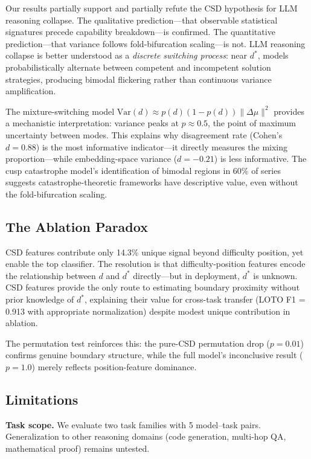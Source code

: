 \documentclass[11pt,letterpaper]{article}
\begin{document}
Our results partially support and partially refute the CSD hypothesis for LLM reasoning collapse. The qualitative prediction---that observable statistical signatures precede capability breakdown---is confirmed. The quantitative prediction---that variance follows fold-bifurcation scaling---is not. LLM reasoning collapse is better understood as a \emph{discrete switching process}: near $d^*$, models probabilistically alternate between competent and incompetent solution strategies, producing bimodal flickering rather than continuous variance amplification.

The mixture-switching model $\text{Var}(d) \approx p(d)(1-p(d))\|\Delta\mu\|^2$ provides a mechanistic interpretation: variance peaks at $p \approx 0.5$, the point of maximum uncertainty between modes. This explains why disagreement rate (Cohen's $d = 0.88$) is the most informative indicator---it directly measures the mixing proportion---while embedding-space variance ($d = -0.21$) is less informative. The cusp catastrophe model's identification of bimodal regions in 60\% of series suggests catastrophe-theoretic frameworks have descriptive value, even without the fold-bifurcation scaling.

\subsection{The Ablation Paradox}

CSD features contribute only 14.3\% unique signal beyond difficulty position, yet enable the top classifier. The resolution is that difficulty-position features encode the relationship between $d$ and $d^*$ directly---but in deployment, $d^*$ is unknown. CSD features provide the only route to estimating boundary proximity without prior knowledge of $d^*$, explaining their value for cross-task transfer (LOTO F1 = 0.913 with appropriate normalization) despite modest unique contribution in ablation.

The permutation test reinforces this: the pure-CSD permutation drop ($p = 0.01$) confirms genuine boundary structure, while the full model's inconclusive result ($p = 1.0$) merely reflects position-feature dominance.

\subsection{Limitations}

\textbf{Task scope.} We evaluate two task families with 5 model--task pairs. Generalization to other reasoning domains (code generation, multi-hop QA, mathematical proof) remains untested.
\end{document}
